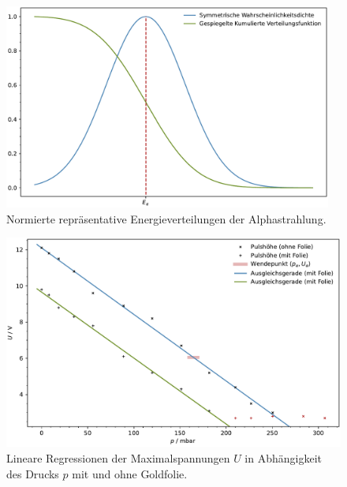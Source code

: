 \begin{figure}[H]
    \centering
    \includegraphics[width=0.963\textwidth]{content/messung/Energieverteilung.pdf}
    \caption{Normierte repräsentative Energieverteilungen der Alphastrahlung.}
    \label{fig:Energieverteilung}
\end{figure}

\begin{figure}[H]
    \centering
    \includegraphics[width=\textwidth]{content/messung/Golddicke.pdf}
    \caption{Lineare Regressionen der Maximalspannungen $U$ in Abhängigkeit des Drucks $p$ mit und ohne Goldfolie.}
    \label{fig:Golddicke}
\end{figure}


